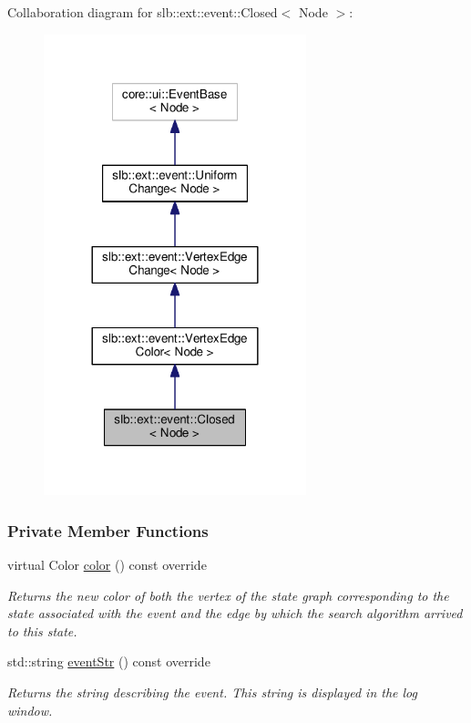 Collaboration diagram for slb\+:\+:ext\+:\+:event\+:\+:Closed$<$ Node $>$\+:\nopagebreak
\begin{figure}[H]
\begin{center}
\leavevmode
\includegraphics[width=216pt]{structslb_1_1ext_1_1event_1_1Closed__coll__graph}
\end{center}
\end{figure}
\subsubsection*{Private Member Functions}
\begin{DoxyCompactItemize}
\item 
virtual Color \hyperlink{structslb_1_1ext_1_1event_1_1Closed_a481066c0af982217bc6de618cfe48ee5}{color} () const override
\begin{DoxyCompactList}\small\item\em Returns the new color of both the vertex of the state graph corresponding to the state associated with the event and the edge by which the search algorithm arrived to this state. \end{DoxyCompactList}\item 
std\+::string \hyperlink{structslb_1_1ext_1_1event_1_1Closed_af3366063cd8e6c3c6f92497888588331}{event\+Str} () const override
\begin{DoxyCompactList}\small\item\em Returns the string describing the event. This string is displayed in the log window. \end{DoxyCompactList}\end{DoxyCompactItemize}
